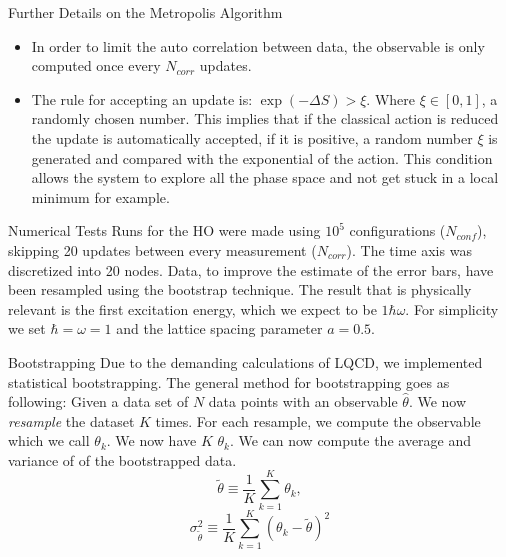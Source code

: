 \documentclass[10pt]{beamer}
\begin{document}
\begin{frame}{Further Details on the Metropolis Algorithm}
\begin{itemize}
\item In order to limit the auto correlation between data, the observable is only computed once every $N_{corr}$ updates. 
\item The rule for accepting an update is: $\exp(-\Delta S) > \xi$. Where $\xi \in [0,1]$, a randomly chosen number. This implies that if the classical action is reduced the update is automatically accepted, if it is positive, a random number $\xi$ is generated and compared with the exponential of the action. This condition allows the system to explore all the phase space and not get stuck in a local minimum for example.
\end{itemize} 
\end{frame}


\begin{frame}{Numerical Tests}
Runs for the HO were made using $10^5$ configurations ($N_{conf}$), skipping 20 updates between every measurement ($N_{corr}$). The time axis was discretized into 20 nodes. Data, to improve the estimate of the error bars, have been resampled using the bootstrap technique. 
The result that is physically relevant is the first excitation energy, which we expect to be $1\hbar\omega$. For simplicity we set $\hbar=\omega=1$ and the lattice spacing parameter $a = 0.5$.
\end{frame}


\begin{frame}{Bootstrapping}
Due to the demanding calculations of LQCD, we implemented statistical bootstrapping. The general method for bootstrapping goes as following: Given a data set of $N$ data points with an observable $\hat{\theta}$. We now \textit{resample} the dataset $K$ times. For each resample, we compute the observable which we call $\theta_k$. We now have $K$ $\theta_k$. We can now compute the average and variance of of the bootstrapped data.
\[
\tilde{\theta} \equiv \frac{1}{K}\sum^K_{k=1}\theta_k,
\]
\[
\sigma^2_{\tilde{\theta}} \equiv \frac{1}{K}\sum^K_{k=1}(\theta_k - \tilde{\theta})^2
\]
\end{frame}
\end{document}
